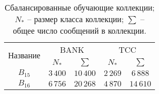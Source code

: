 \begin{table}[htp!]
\centering
\caption{Сбалансированные обучающие коллекции;
    $N_*$ -- размер класса коллекции;
    $\sum$ -- общее число сообщений в коллекции.
}
\label{table:balancedTrainCollections}
\begin{tabular}{ccccc}
    \hline
    \multicolumn{1}{c|}{\multirow{2}{*}{Название}} & \multicolumn{2}{c|}{BANK}                                & \multicolumn{2}{c}{TCC}               \\ \cline{2-5}
    \multicolumn{1}{c|}{}                          & \multicolumn{1}{c|}{$N_*$} & \multicolumn{1}{c|}{$\sum$} & \multicolumn{1}{c|}{$N_*$} & $\sum$   \\ \hline
    $B_{15}$                                       & $3\hspace{2pt}400$                    & $10\hspace{2pt}400$                    & $2\hspace{2pt}269$                    & $6\hspace{2pt}888$  \\
    $B_{16}$                                       & $6\hspace{2pt}756$                    & $20\hspace{2pt}268$                    & $4\hspace{2pt}870$                    & $14\hspace{2pt}610$ \\ \hline
\end{tabular}
\end{table}
